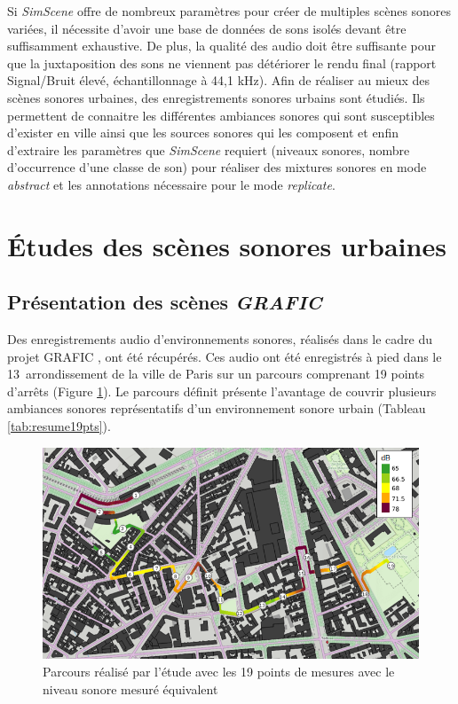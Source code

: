 Si \textit{SimScene} offre de nombreux paramètres pour créer de multiples scènes sonores variées, il nécessite d'avoir une base de données de sons isolés devant être suffisamment exhaustive. De plus, la qualité des audio doit être suffisante pour que la juxtaposition des sons ne viennent pas détériorer le rendu final (rapport Signal/Bruit élevé, échantillonnage à 44,1 kHz). Afin de réaliser au mieux des scènes sonores urbaines, des enregistrements sonores urbains sont étudiés. Ils permettent de connaitre les différentes ambiances sonores qui sont susceptibles d'exister en ville ainsi que les sources sonores qui les composent et enfin d'extraire les paramètres que \textit{SimScene} requiert (niveaux sonores, nombre d'occurrence d'une classe de son) pour réaliser des mixtures sonores en mode \textit{abstract} et les annotations nécessaire pour le mode \textit{replicate}. \\

\section{Études des scènes sonores urbaines}
\subsection{Présentation des scènes \textit{GRAFIC}}

Des enregistrements audio d'environnements sonores, réalisés dans le cadre du projet GRAFIC \cite{aumond_modelling_2017}, ont été récupérés. Ces audio ont été enregistrés à pied dans le 13\ieme~arrondissement de la ville de Paris sur un parcours comprenant 19 points d'arrêts (Figure \ref{fig:parcoursGRAFIC}). Le parcours définit présente l'avantage de couvrir plusieurs ambiances sonores représentatifs d'un environnement sonore urbain (Tableau \ref{tab:resume19pts}).\\
 
\begin{figure}[hbtp]
\centering
\includegraphics[width=.7\textwidth]{./figures/grafic/trajet_19pts.png}
\caption{Parcours réalisé par l'étude avec les 19 points de mesures avec le niveau sonore mesuré équivalent}
\label{fig:parcoursGRAFIC}
\end{figure}

